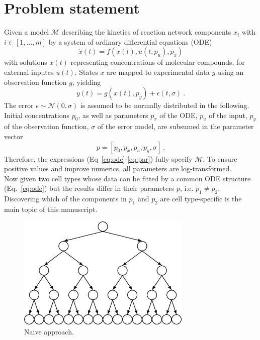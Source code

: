 \documentclass{bioinfo}
\begin{document}
\section{Problem statement}

Given a model $\mathcal M$ describing the kinetics of reaction network components $x_i$ with $i \in [1,\dots,m]$ by a system of ordinary differential equations (ODE)
\begin{equation}
\dot x(t) = f(x(t),u(t,p_u),p_x)\label{eq:ode}
\end{equation}
with solutions $x(t)$ representing concentrations of molecular compounds, for external inputes $u(t)$.
States $x$ are mapped to experimental data $y$ using an observation function $g$, yielding
\begin{equation}
y(t) = g(x(t),p_y)+\epsilon(t,\sigma) \:.\label{eq:obs}
\end{equation}
The error $\epsilon \sim \mathcal N(0,\sigma)$ is assumed to be normally distributed in the following.
Initial concentrations $p_0$, as well as parameters $p_x$ of the ODE, $p_u$ of the input, $p_y$ of the observation function, $\sigma$ of the error model, are subsumed in the parameter vector
\begin{equation}
p = [p_0, p_x, p_u, p_y, \sigma] \:.\label{eq:par}
\end{equation}
Therefore, the expressions (Eq~\ref{eq:ode}-\ref{eq:par}) fully specify $\mathcal M$.
To ensure positive values and improve numerics, all parameters are log-transformed.\\
Now given two cell types whose data can be fitted by a common ODE structure (Eq.~\ref{eq:ode}) but the results differ in their parameters $p$, i.e. $p_1 \neq p_2$.
Discovering which of the components in $p_1$ and $p_2$ are cell type-specific is the main topic of this manuscript.

\begin{figure}[!tpb]%
\centerline{\includegraphics[width=235pt]{Figures/tree.jpg}}
\caption{Naive approach.}\label{fig:01}
\end{figure}
\end{document}
